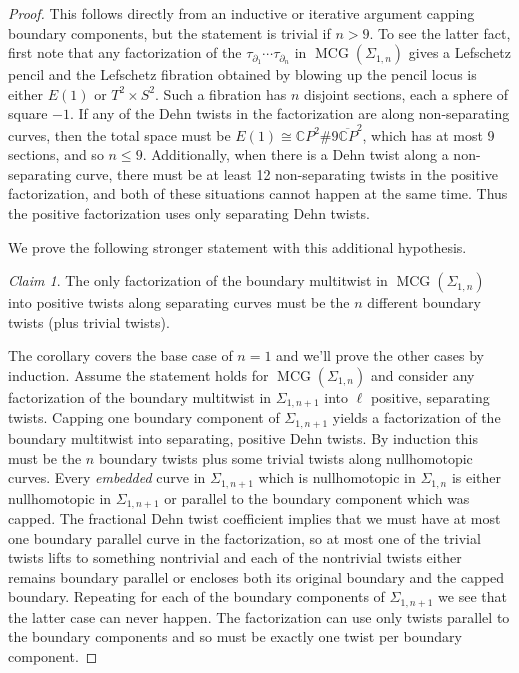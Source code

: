 \documentclass[11pt,letterpaper,reqno]{amsart}
\theoremstyle{remark}
\newtheorem{claim}[theorem]{Claim}
\newcommand{\CP}{{\mathbb CP}^2}
\newcommand{\bCP}{{\overline{\mathbb CP}}^2}
\DeclareMathOperator{\MCG}{MCG}
\begin{document}
\begin{proof} This follows directly from an inductive or iterative argument capping boundary components, but the statement is trivial if $n>9$. To see the latter fact, first note that any factorization of the $\tau_{\partial_1} \cdots \tau_{\partial_n}$ in $\MCG(\Sigma_{1,n})$ gives a Lefschetz pencil and the Lefschetz fibration obtained by blowing up the pencil locus is either $E(1)$ or $T^2\times S^2$. Such a fibration has $n$ disjoint sections, each a sphere of square $-1$. If any of the Dehn twists in the factorization are along non-separating curves, then the total space must be $E(1)\cong \CP\# 9\bCP$, which has at most 9 sections, and so $n\leq 9$. Additionally, when there is a Dehn twist along a non-separating curve, there must be at least 12 non-separating twists in the positive factorization, and both of these situations cannot happen at the same time. Thus the positive factorization uses only separating Dehn twists. %

We prove the following stronger statement with this additional hypothesis. 

\begin{claim} \label{lem:fact1n} The only factorization of the boundary multitwist in $\MCG(\Sigma_{1,n})$ into positive twists along separating curves must be the $n$ different boundary twists (plus trivial twists). \end{claim}

The corollary covers the base case of $n=1$ and we'll prove the other cases by induction. Assume the statement holds for $\MCG(\Sigma_{1,n})$ and consider any factorization of the boundary multitwist in $\Sigma_{1,n+1}$ into $\ell$ positive, separating twists. Capping one boundary component of $\Sigma_{1,n+1}$ yields a factorization of the boundary multitwist into separating, positive Dehn twists. By induction this must be the $n$ boundary twists plus some trivial twists along nullhomotopic curves. Every \emph{embedded} curve in $\Sigma_{1,n+1}$ which is nullhomotopic in $\Sigma_{1,n}$ is either nullhomotopic in $\Sigma_{1,n+1}$ or parallel to the boundary component which was capped. The fractional Dehn twist coefficient implies that we must have at most one boundary parallel curve in the factorization, so at most one of the trivial twists lifts to something nontrivial and each of the nontrivial twists either remains boundary parallel or encloses both its original boundary and the capped boundary. Repeating for each of the boundary components of $\Sigma_{1,n+1}$ we see that the latter case can never happen.
The factorization can use only twists parallel to the boundary components and so must be exactly one twist per boundary component.
\end{proof}
\end{document}
